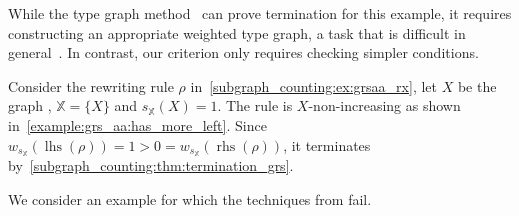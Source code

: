 While the type graph method~\cite{bruggink2014termination, bruggink2015proving,endrullis2024generalized_arxiv_v2} can prove termination for this example, it requires constructing an appropriate weighted type graph, a task that is difficult in general~\cite[]{bruggink2015proving}. 
In contrast, our criterion only requires checking simpler conditions.
\begin{example}
    \label{subgraph_counting:ex:termination:grsaa}
    Consider the rewriting rule $\rho$ in~\autoref{subgraph_counting:ex:grsaa_rx}, let $X$ be the graph , $\mathbb{X} = \{X\}$ and $s_\mathbb{X}(X) = 1$. The rule is $X$-non-increasing as shown in~\autoref{example:grs_aa:has_more_left}. 
    Since \(w_{s_\mathbb{X}}(\operatorname{lhs}(\rho)) = 1 > 0 = w_{s_\mathbb{X}}(\operatorname{rhs}(\rho)) \),
    it terminates by~\autoref{subgraph_counting:thm:termination_grs}.
\end{example}
We consider an example for which the techniques from \cite{bruggink2014termination,bruggink2015proving,endrullis2024generalized_arxiv_v2,plump2018modular,overbeek2024termination_lmcs} fail.
